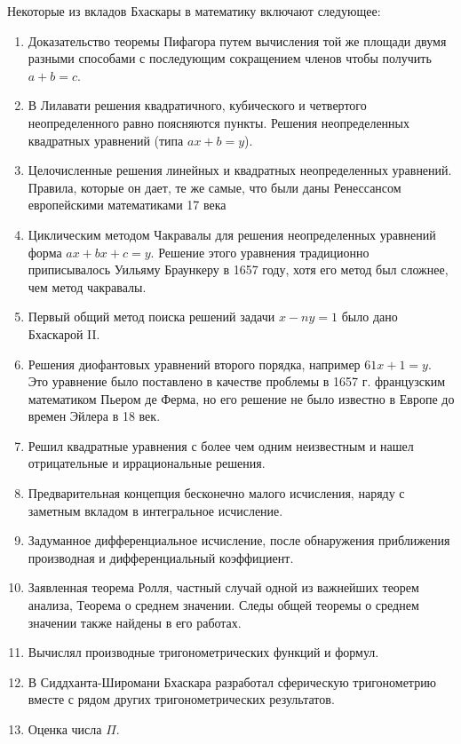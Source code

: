 \documentclass[12pt, a4paper]{article}
\begin{document}
Некоторые из вкладов Бхаскары в математику включают следующее:
\begin{enumerate}
\item Доказательство теоремы Пифагора путем вычисления той же площади двумя разными способами с последующим сокращением членов чтобы получить $a + b = c$.
\item В Лилавати решения квадратичного, кубического и четвертого неопределенного равно поясняются пункты.
Решения неопределенных квадратных уравнений (типа $a x + b = y$).
\item Целочисленные решения линейных и квадратных неопределенных уравнений. Правила, которые он дает, те же самые, что были даны Ренессансом европейскими математиками 17 века
\item Циклическим методом Чакравалы для решения неопределенных уравнений форма $a x + b x + c = y$. Решение этого уравнения традиционно приписывалось Уильяму Браункеру в 1657 году, хотя его метод был сложнее, чем метод чакравалы.
\item Первый общий метод поиска решений задачи $x - ny = 1$ было дано Бхаскарой II.
\item Решения диофантовых уравнений второго порядка, например $61 x + 1 = y$. Это уравнение было поставлено в качестве проблемы в 1657 г. французским математиком Пьером де Ферма, но его решение не было известно в Европе до времен Эйлера в 18 век.
\item Решил квадратные уравнения с более чем одним неизвестным и нашел отрицательные и иррациональные решения.
\item Предварительная концепция бесконечно малого исчисления, наряду с заметным вкладом в интегральное исчисление.
\item Задуманное дифференциальное исчисление, после обнаружения приближения производная и дифференциальный коэффициент.
\item Заявленная теорема Ролля, частный случай одной из важнейших теорем анализа, Теорема о среднем значении. Следы общей теоремы о среднем значении также найдены в его работах.
\item Вычислял производные тригонометрических функций и формул.
\item В Сиддханта-Широмани Бхаскара разработал сферическую тригонометрию вместе с рядом других тригонометрических результатов.
\item Оценка числа $\Pi$.
\end{enumerate}
\end{document}
